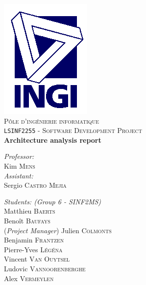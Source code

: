 \begin{titlepage}

\rm %

\begin{center}

\includegraphics[scale=.5]{ingi.png}\\[2cm]

\textsc{\LARGE Pôle d'ingénierie informatique}\\[1.5cm]

\textsc{\Large \texttt{LSINF2255} - Software Development Project}\\[0.5cm]


\vspace{3.5cm}
{ \huge \bfseries Architecture analysis report\vspace{0.8cm}}

\vspace{3.5cm}

\begin{minipage}{0.4\textwidth}
\begin{flushleft} \large
\emph{Professor:}\\
	Kim \textsc{Mens}\\
\vspace{1cm}
\emph{Assistant:}\\
	Sergio \textsc{Castro Mejia} %
\end{flushleft}
\end{minipage}
\begin{minipage}{0.4\textwidth}
\begin{flushright} \large
\emph{Students: (Group 6 - SINF2MS)} \\
	Matthieu \textsc{Baerts}\\
	Benoît \textsc{Baufays}\\
	(\textit{Project Manager}) Julien \textsc{Colmonts}\\
	Benjamin \textsc{Frantzen}\\
	Pierre-Yves \textsc{Légéna}\\
	Vincent \textsc{Van Ouytsel}\\
	Ludovic \textsc{Vannoorenberghe}\\
	Alex \textsc{Vermeylen}
\end{flushright}
\end{minipage}


\end{center}
\end{titlepage}
